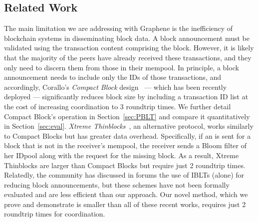 \subsection{Related Work} 
The main limitation we are addressing with Graphene is the inefficiency of blockchain systems in disseminating block data.  A block announcement
must be validated using  the transaction content comprising the block.  However, it is likely that the majority of the
peers have already received these transactions, and they only
need to discern them from those in their
mempool. In principle, a block announcement needs to include only the IDs of those transactions,
and accordingly, Corallo's {\em Compact Block} design~\cite{Corallo:2016} --- which has been recently deployed --- significantly reduces block size by including a  transaction ID list at the cost of increasing coordination to 3 roundtrip times. We further detail Compact Block's operation in Section~\ref{sec:PBLT} and compare  it quantitatively in Section~\ref{sec:eval}.
%
%
{\em Xtreme Thinblocks}~\cite{Tschipper:2016}, an alternative protocol, works similarly to Compact Blocks but has greater data overhead. Specifically, if an \inv is sent for a block that is not in the receiver's mempool, the receiver sends a Bloom filter of her IDpool along with the request for the missing block. As a result, Xtreme Thinblocks are larger than Compact Blocks but require just 2 roundtrip times. Relatedly, the community has discussed in forums the use of IBLTs (alone) for reducing block announcements\cite{andresen:2014,Russel:2014}, but these schemes have not been formally evaluated and are less efficient than our approach. Our novel method, which we prove and demonstrate is smaller than all of these recent works, requires just 2 roundtrip times for coordination.
\vspace{-5ex}
% 
%
